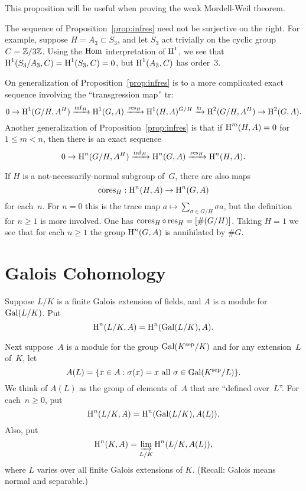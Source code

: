 This proposition will be useful when proving
the weak Mordell-Weil theorem.

\begin{example}
The sequence of Proposition~\ref{prop:infres} need not be
surjective on the right.  For example, suppose $H=A_3 \subset S_3$,
and let $S_3$ act trivially on the cyclic group $C = \mathbb{Z}/3\mathbb{Z}$.
Using the $\operatorname{Hom}$ interpretation of $\operatorname{H}^1$, we see
that
$\operatorname{H}^1(S_3/A_3, C) = \operatorname{H}^1(S_3, C) = 0$, but
$\operatorname{H}^1(A_3, C)$ has order~$3$.
\end{example}


\begin{remark}
On generalization of Proposition~\ref{prop:infres} is to
a more complicated exact sequence involving the ``transgression map''
tr:
$$
  0 \to \operatorname{H}^1(G/H, A^H)\xrightarrow{\operatorname{inf}_H} \operatorname{H}^1(G,A)\xrightarrow{\operatorname{res}_H} \operatorname{H}^1(H,A)^{G/H}
\xrightarrow{{\rm tr}}  \operatorname{H}^2(G/H,A^H) \to \operatorname{H}^2(G,A).
$$
Another generalization of Proposition~\ref{prop:infres}
is that if $\operatorname{H}^m(H,A) = 0$ for $1\leq m < n$, then
there is an exact sequence
$$
 0 \to \operatorname{H}^n(G/H, A^H)\xrightarrow{\operatorname{inf}_H}  \operatorname{H}^n(G,A)\xrightarrow{\operatorname{res}_H} \operatorname{H}^n(H,A).
$$
\end{remark}

\begin{remark}\label{rmk:cores}
  If $H$ is a not-necessarily-normal subgroup of~$G$, there are also
  maps
$$
 \operatorname{cores}_H: \operatorname{H}^n(H,A) \to \operatorname{H}^n(G,A)
$$
for each~$n$.  For $n=0$ this is the trace map $a\mapsto \sum_{\sigma
  \in G/H} \sigma a$, but the definition for $n\geq 1$ is more involved.
One has $\operatorname{cores}_H \circ \operatorname{res}_H = [\#(G/H)]$.
Taking $H=1$ we see
that for each $n\geq 1$ the group
$\operatorname{H}^n(G,A)$ is annihilated by $\#G$.
\end{remark}

\section{Galois Cohomology}
Suppose $L/K$ is a finite Galois extension of
fields, and $A$ is a module for $\operatorname{Gal}(L/K)$.
Put
$$
 \operatorname{H}^n(L/K, A) = \operatorname{H}^n(\operatorname{Gal}(L/K), A).
$$

Next suppose~$A$ is a module for the group $\operatorname{Gal}(K^{\operatorname{sep}}/K)$
and for any extension~$L$ of~$K$, let
$$A(L) = \{x \in A : \sigma(x) = x \text{ all } \sigma \in\operatorname{Gal}(K^{\operatorname{sep}}/L)\}.$$
We think of $A(L)$ as the group of elements of~$A$ that are
``defined over~$L$''.
For each~$n\geq 0$, put
 $$
  \operatorname{H}^n(L/K, A) = \operatorname{H}^n(\operatorname{Gal}(L/K), A(L)).
$$
Also, put
$$
 \operatorname{H}^n(K,A) = \varinjlim_{L/K} \operatorname{H}^n(L/K,A(L)),
$$
where $L$ varies over all finite Galois extensions of $K$.
(Recall: Galois means normal and separable.)

